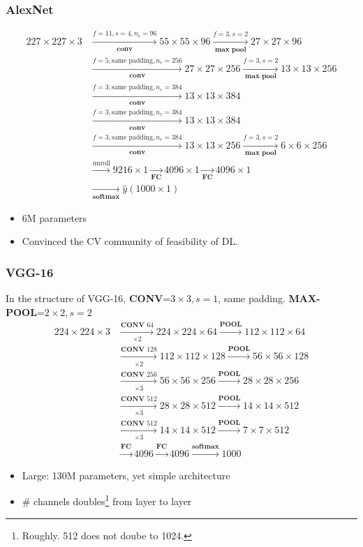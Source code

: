 \subsubsection{AlexNet}
\begin{align*}
  227\times 227\times 3&\xrightarrow[\textbf{conv}]{f=11,s=4,n_c=96}55\times 55\times 96\xrightarrow[\textbf{max pool}]{f=3,s=2}27\times 27\times 96\\
  &\xrightarrow[\textbf{conv}]{f=5,\text{same padding},n_c=256}27\times 27\times 256\xrightarrow[\textbf{max pool}]{f=3,s=2}13\times 13\times 256\\
  &\xrightarrow[\textbf{conv}]{f=3,\text{same padding},n_c=384}13\times 13\times 384\\
  &\xrightarrow[\textbf{conv}]{f=3,\text{same padding},n_c=384}13\times 13\times 384\\
  &\xrightarrow[\textbf{conv}]{f=3,\text{same padding},n_c=384}13\times 13\times 256\xrightarrow[\textbf{max pool}]{f=3,s=2}6\times 6\times 256\\
  &\xrightarrow{\text{unroll}}9216\times 1\xrightarrow[\textbf{FC}]{}4096\times 1\xrightarrow[\textbf{FC}]{}4096\times 1\\
  &\xrightarrow[\textbf{softmax}]{}\hat{y}(1000\times 1)
\end{align*}
\begin{itemize}
  \item 6M parameters
  \item Convinced the CV community of feasibility of DL.
\end{itemize}
\subsubsection{VGG-16}
In the structure of VGG-16, \textbf{CONV}=$3\times 3, s=1$, same padding. \textbf{MAX-POOL}=$2\times 2, s=2$
\begin{align*}
  224\times 224\times 3&\xrightarrow[\times 2]{\textbf{CONV } 64}224\times 224\times 64\xrightarrow{\textbf{POOL}}112\times 112\times 64\\
  &\xrightarrow[\times 2]{\textbf{CONV } 128}112\times 112\times 128\xrightarrow{\textbf{POOL}}56\times 56\times 128\\
  &\xrightarrow[\times 3]{\textbf{CONV } 256}56\times 56\times 256\xrightarrow{\textbf{POOL}}28\times 28\times 256\\
  &\xrightarrow[\times 3]{\textbf{CONV } 512}28\times 28\times 512\xrightarrow{\textbf{POOL}}14\times 14\times 512\\
  &\xrightarrow[\times 3]{\textbf{CONV } 512}14\times 14\times 512\xrightarrow{\textbf{POOL}}7\times 7\times 512\\
  &\xrightarrow{\textbf{FC}}4096\xrightarrow{\textbf{FC}}4096\xrightarrow{\textbf{softmax}}1000
\end{align*}
\begin{itemize}
  \item Large: 130M parameters, yet simple architecture
  \item \# channels doubles\footnote{Roughly. 512 does not doube to 1024.} from layer to layer
\end{itemize}
